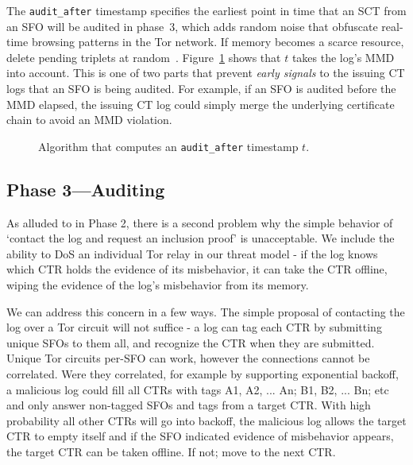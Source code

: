 The \texttt{audit\_after} timestamp specifies the earliest point in time that an SCT
from an SFO will be audited in phase~3, which adds random noise that obfuscate
real-time browsing patterns in the Tor network.  If memory becomes a scarce
resource, delete pending triplets at random~\cite{nordberg}. Figure~\ref{fig:audit-after}
shows that $t$ takes the log's MMD into account.  This is one of two parts that prevent
\emph{early signals} to the issuing CT logs that an SFO is being audited.  For example,
if an SFO is audited before the MMD elapsed, the issuing CT log could simply merge
the underlying certificate chain to avoid an MMD violation.


\begin{figure}
	\centering
	\caption{%
		Algorithm that computes an \texttt{audit\_after} timestamp $t$.
	}
	\label{fig:audit-after}
\end{figure}

\subsection{Phase 3---Auditing} \label{sec:base:phase3}

As alluded to in Phase 2, there is a second problem why the simple behavior of
`contact the log and request an inclusion proof' is unacceptable. We include
the ability to DoS an individual Tor relay in our threat model - if the log
knows which CTR holds the evidence of its misbehavior, it can take the CTR
offline, wiping the evidence of the log's misbehavior from its memory. 

We can address this concern in a few ways. The simple proposal of contacting
the log over a Tor circuit will not suffice - a log can tag each CTR by
submitting unique SFOs to them all, and recognize the CTR when they are
submitted. Unique Tor circuits per-SFO can work, however the connections
cannot be correlated. Were they correlated, for example by supporting
exponential backoff, a malicious log could fill all CTRs with tags A1, A2, ... An;
B1, B2, ... Bn; etc and only answer non-tagged SFOs and tags from a target
CTR\@. With high probability all other CTRs will go into backoff, the malicious log
allows the target CTR to empty itself and if the SFO indicated evidence of
misbehavior appears, the target CTR can be taken offline. If not; move to the
next CTR\@. 

